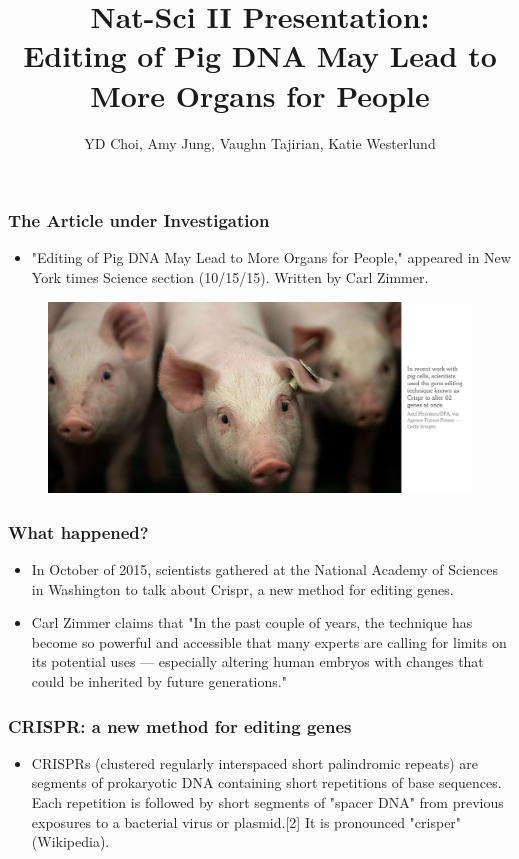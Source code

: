 \documentclass{beamer}
\title{Nat-Sci II Presentation: \\
Editing of Pig DNA May Lead to More Organs for People}
\author{YD Choi, Amy Jung, Vaughn Tajirian, Katie Westerlund }
\institute{New York University}
\begin{document}
 
\frame{\titlepage} 

\begin{frame}
\frametitle{The Article under Investigation}
\begin{itemize} 
\item "Editing of Pig DNA May Lead to More Organs for People," appeared in
New York times Science section (10/15/15). Written by Carl Zimmer.
\end{itemize}
\begin{figure}[h!]
  \centering
    \includegraphics[width=1\textwidth]{edit-pigs.png}
\end{figure}
\end{frame}

\begin{frame}
\frametitle{What happened?}
\begin{itemize}
\item In October of 2015, scientists gathered at the National Academy of Sciences
in Washington to talk about Crispr, a new method for editing genes.
\item Carl Zimmer claims that "In the past couple of years, 
the technique has become so powerful and accessible that many experts are 
calling for limits on its potential uses — especially altering human 
embryos with changes that could be inherited by future generations."
\end{itemize}
\end{frame}
\begin{frame}
\frametitle{CRISPR: a new method for editing genes}
\begin{itemize}
\item 
CRISPRs (clustered regularly interspaced short palindromic repeats) are 
segments of prokaryotic DNA containing short repetitions of base sequences.
Each repetition is followed by short segments of "spacer DNA" from previous
exposures to a bacterial virus or plasmid.[2] It is pronounced "crisper" 
(Wikipedia).
\end{itemize}
\end{frame}
\end{document}
